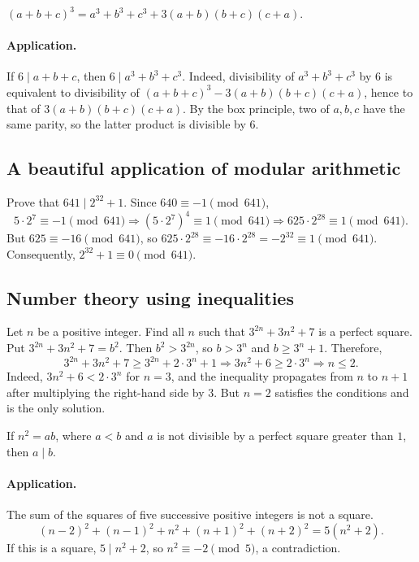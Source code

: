 \documentclass[11pt,a4paper]{article}
\begin{document}
\setcounter{theorem}{12}\begin{lemma}
$(a+b+c)^3=a^3+b^3+c^3+3(a+b)(b+c)(c+a)$.
\end{lemma}
\paragraph{Application.}
If $6\mid a+b+c$, then $6\mid a^3+b^3+c^3$.
Indeed, divisibility of $a^3+b^3+c^3$ by $6$ is equivalent to divisibility of
$(a+b+c)^3-3(a+b)(b+c)(c+a)$, hence to that of $3(a+b)(b+c)(c+a)$.
By the box principle, two of $a,b,c$ have the same parity, so the latter product is divisible by $6$.

\subsection{A beautiful application of modular arithmetic}
Prove that $641\mid2^{32}+1$.
Since $640\equiv-1\pmod{641}$,
\[
5\cdot2^7\equiv-1\pmod{641}
\Longrightarrow(5\cdot2^7)^4\equiv1\pmod{641}
\Longrightarrow625\cdot2^{28}\equiv1\pmod{641}.
\]
But $625\equiv-16\pmod{641}$, so
$625\cdot2^{28}\equiv-16\cdot2^{28}=-2^{32}\equiv1\pmod{641}$.
Consequently, $2^{32}+1\equiv0\pmod{641}$.

\subsection{Number theory using inequalities}
Let $n$ be a positive integer. Find all $n$ such that $3^{2n}+3n^2+7$ is a perfect square.
Put $3^{2n}+3n^2+7=b^2$. Then $b^2>3^{2n}$, so $b>3^n$ and $b\geq3^n+1$.
Therefore,
\[
3^{2n}+3n^2+7\geq3^{2n}+2\cdot3^n+1
\Longrightarrow3n^2+6\geq2\cdot3^n
\Longrightarrow n\leq2.
\]
Indeed, $3n^2+6<2\cdot3^n$ for $n=3$, and the inequality propagates from
$n$ to $n+1$ after multiplying the right-hand side by $3$.
But $n=2$ satisfies the conditions and is the only solution.

\setcounter{theorem}{15}\begin{lemma}
If $n^2=ab$, where $a<b$ and $a$ is not divisible by a perfect square greater than $1$, then $a\mid b$.
\end{lemma}
\paragraph{Application.}
The sum of the squares of five successive positive integers is not a square.
\[
(n-2)^2+(n-1)^2+n^2+(n+1)^2+(n+2)^2=5(n^2+2).
\]
If this is a square, $5\mid n^2+2$, so $n^2\equiv-2\pmod5$, a contradiction.
\end{document}
